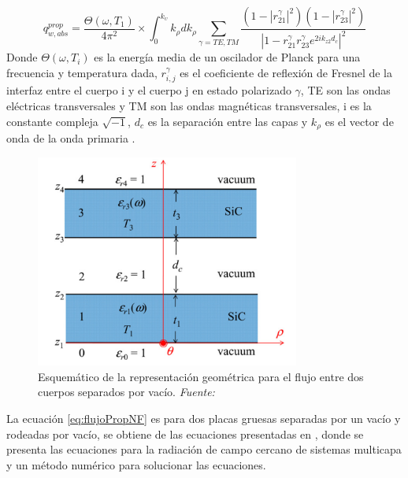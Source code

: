 \begin{equation}
q_{w,abs}^{prop}=\dfrac{\Theta \left( \omega,T_1 \right)}{4 \pi^2}\times \int^{k_\upsilon}_{0} k_\rho d k_\rho \sum_{\gamma=TE,TM}\dfrac{\left( 1- \left| r_{21}^\gamma \right|^2\right) \left( 1-  \left| r_{23}^\gamma \right|^2 \right)}{\left| 1- r_{21}^\gamma r_{23}^\gamma e^{2ik_{z2}d_{c}} \right|^2}
\label{eq:flujoPropNF}
\end{equation}
Donde $\Theta \left( \omega,T_i \right)$ es la energía media de un oscilador de Planck para una frecuencia y temperatura dada, $r_{i,j}^\gamma$ es el coeficiente de reflexión de Fresnel de la interfaz entre el cuerpo i y el cuerpo j en estado polarizado $\gamma$, TE son las ondas eléctricas transversales y TM son las ondas magnéticas transversales, i es la constante compleja $\sqrt{-1}$, $d_c$ es la separación entre las capas y $k_\rho$ es el vector de onda de la onda primaria \cite{nfTPV_fullEquations}.\\
\begin{figure}[H]
	\centering
		\includegraphics[height=7cm]{figuras/campoCercanoEquation1.png}
	\caption{Esquemático de la representación geométrica para el flujo entre dos cuerpos separados por vacío. \textit{Fuente: \cite{nfTPV_equations}}}
	\label{fig:campoCercanoEquation1}
\end{figure}
La ecuación \ref{eq:flujoPropNF} es para dos placas gruesas separadas por un vacío y rodeadas por vacío, se obtiene de las ecuaciones presentadas en \cite{nfTPV_fullEquations}, donde se presenta las ecuaciones para la radiación de campo cercano de sistemas multicapa y un método numérico para solucionar las ecuaciones.

